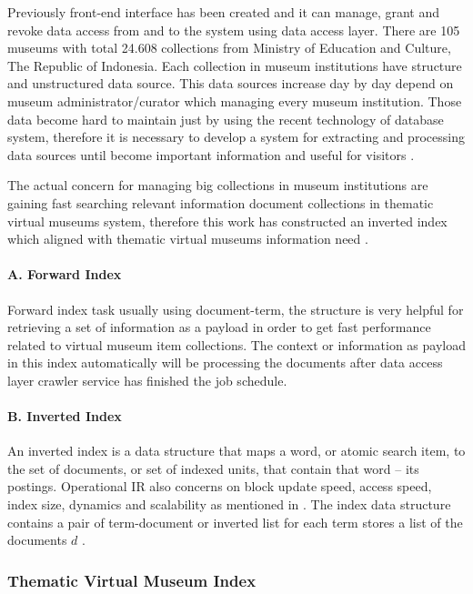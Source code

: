 Previously front-end interface has been created and it can manage, grant and revoke data access from and to the system using data access layer. There are 105 museums with total 24.608 collections from Ministry of Education and Culture, The Republic of Indonesia. Each collection in museum institutions have structure and unstructured data source. This data sources increase day by day depend on museum administrator/curator which managing every museum institution. Those data become hard to maintain just by using the recent technology of database system, therefore it is necessary to develop a system for extracting and processing data sources until become important information and useful for visitors \cite{AnggaiBlekanovSergeev2015}.

The actual concern for managing big collections in museum institutions are gaining fast searching relevant information document collections in thematic virtual museums system, therefore this work has constructed an inverted index which aligned with thematic virtual museums information need \cite{AnggaiBlekanovSergeev2014}.

\paragraph{A. Forward Index}
Forward index task usually using document-term, the structure is very helpful for retrieving a set of information as a payload in order to get fast performance related to virtual museum item collections. The context or information as payload in this index automatically will be processing the documents after data access layer crawler service has finished the job schedule.

\paragraph{B. Inverted Index}
An inverted index is a data structure that maps a word, or atomic search item, to the set of documents, or set of indexed units, that contain that word -- its postings. Operational IR also concerns on block update speed, access speed, index size, dynamics and scalability as mentioned in \cite{CuttingPedersen}. The index data structure contains a pair of term-document or inverted list for each term stores a list of the documents \(d\) \cite{MoffatZobel}.

\subsubsection{Thematic Virtual Museum Index}

